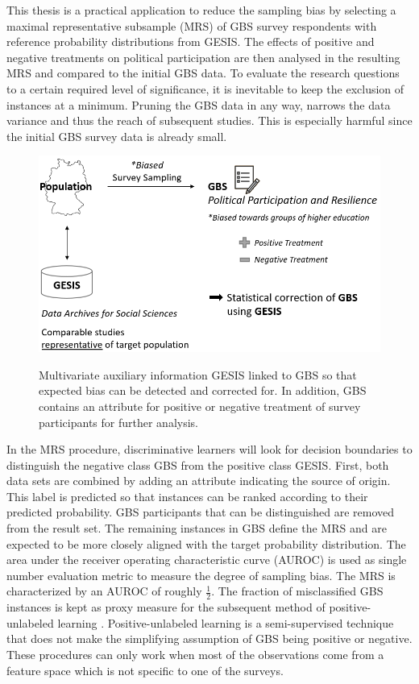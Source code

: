 This thesis is a practical application to reduce the sampling bias by selecting a maximal representative subsample (MRS) of GBS survey respondents with reference probability distributions from GESIS. The effects of positive and negative treatments on political participation are then analysed in the resulting MRS and compared to the initial GBS data. To evaluate the research questions to a certain required level of significance, it is inevitable to keep the exclusion of instances at a minimum. Pruning the GBS data in any way, narrows the data variance and thus the reach of subsequent studies. This is especially harmful since the initial GBS survey data is already small.

\vspace{20pt}
\begin{figure}[ht]
	\begin{center}
		\captionsetup{width= 380pt}
		\includegraphics[scale=0.60,angle=0]{fig/overview}
		\label{project}
		\caption{Multivariate auxiliary information GESIS linked to GBS so that expected bias can be detected and corrected for. In addition, GBS contains an attribute for positive or negative treatment of survey participants for further analysis.}
	\end{center}
\end{figure}

In the MRS procedure, discriminative learners will look for decision boundaries to distinguish the negative class GBS from the positive class GESIS. First, both data sets are combined by adding an attribute indicating the source of origin. This label is predicted so that instances can be ranked according to their predicted probability. GBS participants that can be distinguished are removed from the result set. The remaining instances in GBS define the MRS and are expected to be more closely aligned with the target probability distribution.  The area under the receiver operating characteristic curve (AUROC) is used as single number evaluation metric to measure the degree of sampling bias. The MRS is characterized by an AUROC of roughly \(\frac{1}{2}\). The fraction of misclassified GBS instances is kept as proxy measure for the subsequent method of positive-unlabeled learning \cite{denis, claesen}. Positive-unlabeled learning is a semi-supervised technique that does not make the simplifying assumption of GBS being positive or negative. These procedures can only work when most of the observations come from a feature space which is not specific to one of the surveys.

